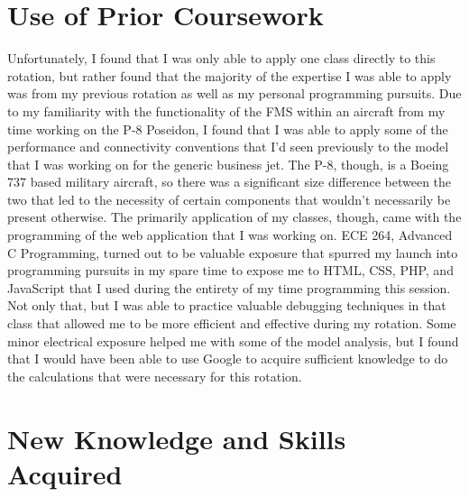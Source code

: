 \documentclass{article}
\begin{document}

\section{Use of Prior Coursework}
Unfortunately, I found that I was only able to apply one class directly to this rotation, but rather found that the majority of the expertise I was able to apply was from my previous rotation as well as my personal programming pursuits. 
Due to my familiarity with the functionality of the FMS within an aircraft from my time working on the P-8 Poseidon, I found that I was able to apply some of the performance and connectivity conventions that I'd seen previously to the model that I was working on for the generic business jet. The P-8, though, is a Boeing 737 based military aircraft, so there was a significant size difference between the two that led to the necessity of certain components that wouldn't necessarily be present otherwise. The primarily application of my classes, though, came with the programming of the web application that I was working on.
ECE 264, Advanced C Programming, turned out to be valuable exposure that spurred my launch into programming pursuits in my spare time to expose me to HTML, CSS, PHP, and JavaScript that I used during the entirety of my time programming this session. Not only that, but I was able to practice valuable debugging techniques in that class that allowed me to be more efficient and effective during my rotation.
Some minor electrical exposure helped me with some of the model analysis, but I found that I would have been able to use Google to acquire sufficient knowledge to do the calculations that were necessary for this rotation.

\newpage
\section{New Knowledge and Skills Acquired}
\end{document}
